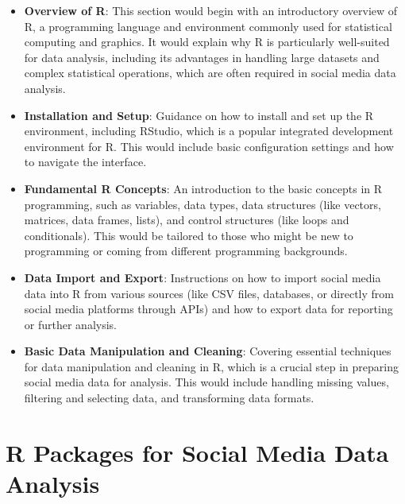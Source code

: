 \documentclass[
]{book}
\providecommand{\tightlist}{%
  \setlength{\itemsep}{0pt}\setlength{\parskip}{0pt}}
\begin{document}
\begin{itemize}
\tightlist
\item
  \textbf{Overview of R}: This section would begin with an introductory overview of R, a programming language and environment commonly used for statistical computing and graphics. It would explain why R is particularly well-suited for data analysis, including its advantages in handling large datasets and complex statistical operations, which are often required in social media data analysis.
\item
  \textbf{Installation and Setup}: Guidance on how to install and set up the R environment, including RStudio, which is a popular integrated development environment for R. This would include basic configuration settings and how to navigate the interface.
\item
  \textbf{Fundamental R Concepts}: An introduction to the basic concepts in R programming, such as variables, data types, data structures (like vectors, matrices, data frames, lists), and control structures (like loops and conditionals). This would be tailored to those who might be new to programming or coming from different programming backgrounds.
\item
  \textbf{Data Import and Export}: Instructions on how to import social media data into R from various sources (like CSV files, databases, or directly from social media platforms through APIs) and how to export data for reporting or further analysis.
\item
  \textbf{Basic Data Manipulation and Cleaning}: Covering essential techniques for data manipulation and cleaning in R, which is a crucial step in preparing social media data for analysis. This would include handling missing values, filtering and selecting data, and transforming data formats.
\end{itemize}

\hypertarget{r-packages-for-social-media-data-analysis}{%
\section*{R Packages for Social Media Data Analysis}\label{r-packages-for-social-media-data-analysis}}
\end{document}
